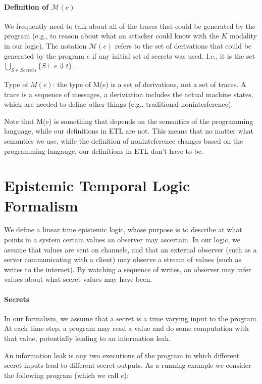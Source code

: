 \documentclass[conference]{IEEEtran}
\theoremstyle{definition}
\newcommand{\sreduce}{\Downarrow}
\newcommand{\judge}{\vdash}
\begin{document}
\paragraph*{Definition of $\mathcal{M}(e)$} We frequently need to talk
about all of the traces that could be generated by the program (e.g.,
to reason about what an attacker could know with the $K$ modality in
our logic).  The notation $\mathcal{M}(e)$ refers to the set of
derivations that could be generated by the program $e$ if any initial
set of secrets was used.  I.e., it is the set $\bigcup_{S \in Secrets}
\{S \judge e { \sreduce t } \}$.

Type of $M(e)$: the type of M(e) is a set of derivations, not a set of
traces.  A trace is a sequence of messages, a deriviation includes the
actual machine states, which are needed to define other things (e.g.,
traditional noninterference).

Note that M(e) is something that depends on the semantics of the
programming language, while our definitions in ETL are not.  This
means that no matter what semantics we use, while the definition of
noninteference changes based on the programming langauge, our
definitions in ETL don't have to be.


\section{Epistemic Temporal Logic Formalism}

We define a linear time epistemic logic, whose purpose is to describe
at what points in a system certain values an observer may ascertain.
In our logic, we assume that values are sent on channels, and that an
external observer (such as a server communicating with a client) may
observe a stream of values (such as writes to the internet).  By
watching a sequence of writes, an observer may infer values about what
secret values may have been.

\paragraph*{Secrets} In our formalism, we assume that a secret is a
time varying input to the program.  At each time step, a program may
read a value and do some computation with that value, potentially
leading to an information leak.

An information leak is any two executions of the program in which
different secret inputs lead to different secret outputs.  As a
running example we consider the following program (which we call
$e$):
\end{document}

